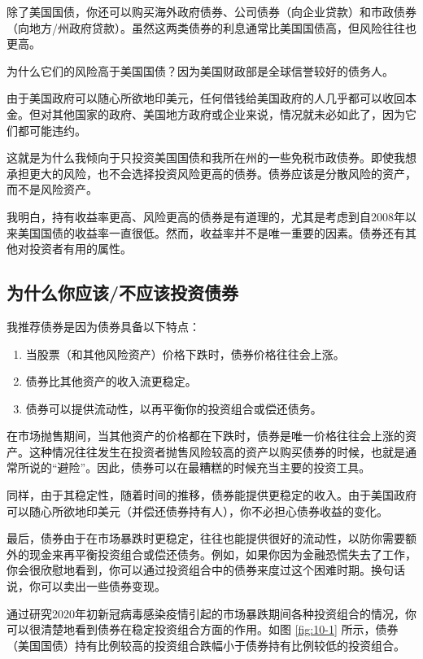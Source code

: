 除了美国国债，你还可以购买海外政府债券、公司债券（向企业贷款）和市政债券（向地方/州政府贷款）。虽然这两类债券的利息通常比美国国债高，但风险往往也更高。

为什么它们的风险高于美国国债？因为美国财政部是全球信誉较好的债务人。

由于美国政府可以随心所欲地印美元，任何借钱给美国政府的人几乎都可以收回本金。但对其他国家的政府、美国地方政府或企业来说，情况就未必如此了，因为它们都可能违约。

这就是为什么我倾向于只投资美国国债和我所在州的一些免税市政债券。即使我想承担更大的风险，也不会选择投资风险更高的债券。债券应该是分散风险的资产，而不是风险资产。

我明白，持有收益率更高、风险更高的债券是有道理的，尤其是考虑到自2008年以来美国国债的收益率一直很低。然而，收益率并不是唯一重要的因素。债券还有其他对投资者有用的属性。

\subsection{为什么你应该/不应该投资债券}
我推荐债券是因为债券具备以下特点：

\begin{enumerate}
\item 当股票（和其他风险资产）价格下跌时，债券价格往往会上涨。
\item 债券比其他资产的收入流更稳定。
\item 债券可以提供流动性，以再平衡你的投资组合或偿还债务。
\end{enumerate}

在市场抛售期间，当其他资产的价格都在下跌时，债券是唯一价格往往会上涨的资产。这种情况往往发生在投资者抛售风险较高的资产以购买债券的时候，也就是通常所说的“避险”。因此，债券可以在最糟糕的时候充当主要的投资工具。

同样，由于其稳定性，随着时间的推移，债券能提供更稳定的收入。由于美国政府可以随心所欲地印美元（并偿还债券持有人），你不必担心债券收益的变化。

最后，债券由于在市场暴跌时更稳定，往往也能提供很好的流动性，以防你需要额外的现金来再平衡投资组合或偿还债务。例如，如果你因为金融恐慌失去了工作，你会很欣慰地看到，你可以通过投资组合中的债券来度过这个困难时期。换句话说，你可以卖出一些债券变现。

通过研究2020年初新冠病毒感染疫情引起的市场暴跌期间各种投资组合的情况，你可以很清楚地看到债券在稳定投资组合方面的作用。如图 \ref{fig:10-1} 所示，债券（美国国债）持有比例较高的投资组合跌幅小于债券持有比例较低的投资组合。

